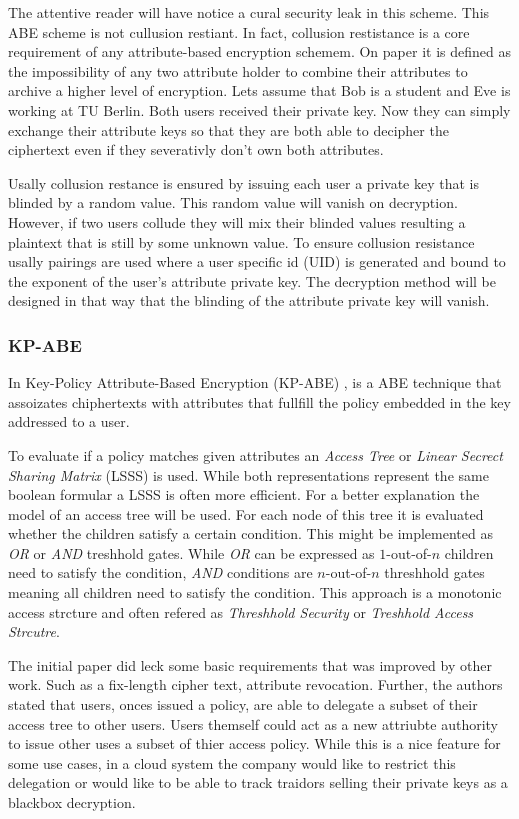 The attentive reader will have notice a cural security leak in this scheme. This \ac{ABE} scheme is not cullusion restiant. In fact, collusion restistance is a core requirement of any attribute-based encryption schemem. On paper it is defined as the impossibility of any two attribute holder to combine their attributes to archive a higher level of encryption. Lets assume that Bob is a student and Eve is working at \ac{TU} Berlin. Both users received their private key. Now they can simply exchange their attribute keys so that they are both able to decipher the ciphertext even if they severativly don't own both attributes.  

Usally collusion restance is ensured by issuing each user a private key that is blinded by a random value. This random value will vanish on decryption. However, if two users collude they will mix their blinded values resulting a plaintext that is still by some unknown value. To ensure collusion resistance usally pairings are used where a user specific id (\ac{UID}) is generated and bound to the exponent of the user's attribute private key. The decryption method will be designed in that way that the blinding of the attribute private key will vanish. 

\subsubsection{\ac{KP-ABE}}
In Key-Policy Attribute-Based Encryption (\ac{KP-ABE}) \cite{goyal2006attribute}, is a \ac{ABE} technique that assoizates chiphertexts with attributes that fullfill the policy embedded in the key addressed to a user. 

To evaluate if a policy matches given attributes an \textit{Access Tree} or \textit{Linear Secrect Sharing Matrix} (\ac{LSSS}) is used. While both representations represent the same boolean formular a \ac{LSSS} is often more efficient. For a better explanation the model of an access tree will be used. For each node of this tree it is evaluated whether the children satisfy a certain condition. This might be implemented as \textit{OR} or \textit{AND} treshhold gates. While \textit{OR} can be expressed as $1$-out-of-$n$ children need to satisfy the condition, \textit{AND} conditions are $n$-out-of-$n$ threshhold gates meaning all children need to satisfy the condition. This approach is a monotonic access strcture and often refered as \textit{Threshhold Security} or \textit{Treshhold Access Strcutre}. 

The initial paper did leck some basic requirements that was improved by other work. Such as a fix-length cipher text, attribute revocation. Further, the authors stated that users, onces issued a policy, are able to delegate a subset of their access tree to other users. Users themself could act as a new attriubte authority to issue other uses a subset of thier access policy. While this is a nice feature for some use cases, in a cloud system the company would like to restrict this delegation or would like to be able to track traidors selling their private keys as a blackbox decryption.

